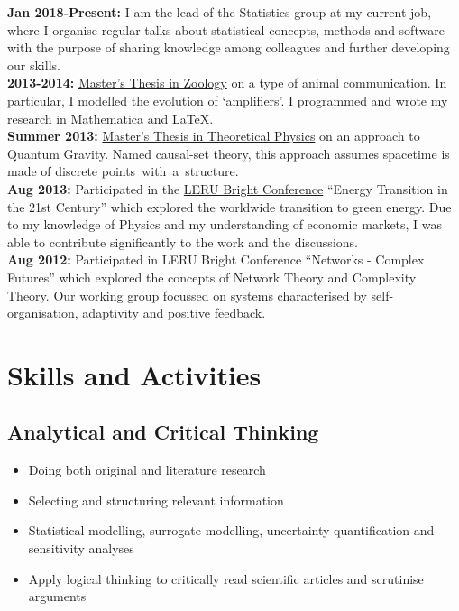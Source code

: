 \documentclass[a4paper,9pt]{extarticle}
\begin{document}
\textbf{Jan 2018-Present:} I am the lead of the Statistics group at my current job, where I organise regular talks about statistical concepts, methods and software with the purpose of sharing knowledge among colleagues and further developing our skills.
\\[2mm]
\textbf{2013-2014:} \href{http://www.bogaardt.eu/?s=lcu}{Master's Thesis in Zoology} on a type of animal communication. In particular, I modelled the evolution of `amplifiers'. I programmed and wrote my research in Mathematica and LaTeX.
\\[2mm]
\textbf{Summer 2013:} \href{http://www.bogaardt.eu/?s=2g7}{Master's Thesis in Theoretical Physics} on an approach to Quantum Gravity. Named causal-set theory, this approach assumes spacetime is made of discrete points~with~a~structure.
\\[2mm]
\textbf{Aug 2013:} Participated in the \href{http://www.leru.org}{LERU Bright Conference} ``Energy Transition in the 21st Century'' which explored the worldwide transition to green energy. Due to my knowledge of Physics and my understanding of economic markets, I was able to contribute significantly to the work and the discussions.
\\[2mm]
\textbf{Aug 2012:} Participated in LERU Bright Conference ``Networks - Complex Futures'' which explored the concepts of Network Theory and Complexity Theory. Our working group focussed on systems characterised by self-organisation, adaptivity and positive feedback.

\vspace{3mm}

\section*{Skills and Activities}

\subsection*{Analytical and Critical Thinking}
\begin{itemize}[leftmargin=*]
\setlength{\itemsep}{-1mm}
\item Doing both original and literature research
\item Selecting and structuring relevant information
\item Statistical modelling, surrogate modelling, uncertainty quantification and sensitivity analyses
\item Apply logical thinking to critically read scientific articles and scrutinise arguments
\end{itemize}
\end{document}
